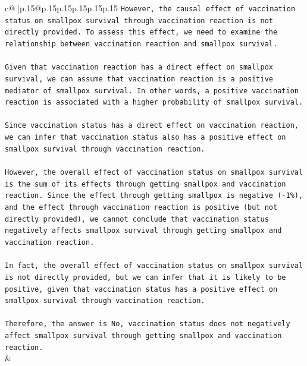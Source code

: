 \documentclass{article}
\begin{document}
{\begin{supertabular}{c@{$\;$}|p{.15\linewidth}@{}p{.15\linewidth}p{.15\linewidth}p{.15\linewidth}p{.15\linewidth}p{.15\linewidth}}
{{{\texttt{However, the causal effect of vaccination status on smallpox survival through vaccination reaction is not directly provided. To assess this effect, we need to examine the relationship between vaccination reaction and smallpox survival.} \\
\\ 
\texttt{Given that vaccination reaction has a direct effect on smallpox survival, we can assume that vaccination reaction is a positive mediator of smallpox survival. In other words, a positive vaccination reaction is associated with a higher probability of smallpox survival.} \\
\\ 
\texttt{Since vaccination status has a direct effect on vaccination reaction, we can infer that vaccination status also has a positive effect on smallpox survival through vaccination reaction.} \\
\\ 
\texttt{However, the overall effect of vaccination status on smallpox survival is the sum of its effects through getting smallpox and vaccination reaction. Since the effect through getting smallpox is negative ({-}1\%), and the effect through vaccination reaction is positive (but not directly provided), we cannot conclude that vaccination status negatively affects smallpox survival through getting smallpox and vaccination reaction.} \\
\\ 
\texttt{In fact, the overall effect of vaccination status on smallpox survival is not directly provided, but we can infer that it is likely to be positive, given that vaccination status has a positive effect on smallpox survival through vaccination reaction.} \\
\\ 
\texttt{Therefore, the answer is No, vaccination status does not negatively affect smallpox survival through getting smallpox and vaccination reaction.} \\
            }
        }
    }
    & \\ \\


\end{supertabular}}
\end{document}
